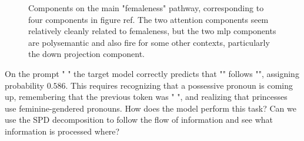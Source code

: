 \documentclass{article}
\begin{document}
\begin{figure}
    \centering
    

    \caption{Components on the main "femaleness" pathway, corresponding to four components in figure ref. The two attention components seem relatively cleanly related to femaleness, but the two mlp components are polysemantic and also fire for some other contexts, particularly the down projection component.}
\end{figure}
On the prompt "     " the target model correctly predicts that "" follows "", assigning probability $0.586$. This requires recognizing that a possessive pronoun is coming up, remembering that the previous token was " ", and realizing that princesses use feminine-gendered pronouns. How does the model perform this task? Can we use the SPD decomposition to follow the flow of information and see what information is processed where?
\end{document}
